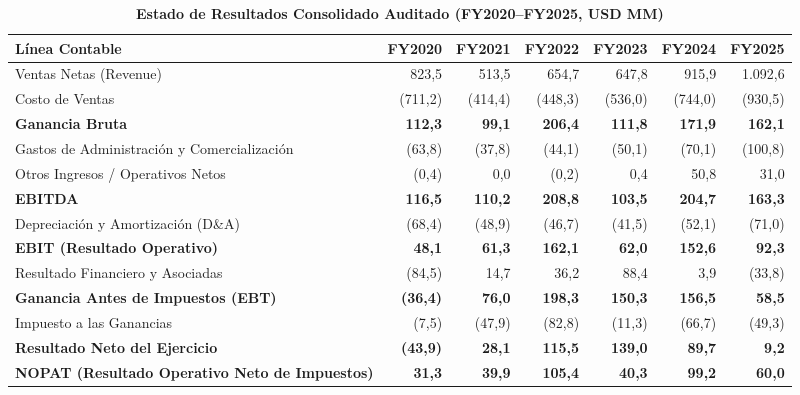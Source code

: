 \documentclass[10pt,a4paper]{article}
\begin{document}
\begin{table}[H]
\centering
\caption{\textbf{Estado de Resultados Consolidado Auditado (FY2020--FY2025, USD MM)}}
\scriptsize
\begin{tabularx}{\textwidth}{Xrrrrrr}
\toprule
\textbf{Línea Contable} & \textbf{FY2020} & \textbf{FY2021} & \textbf{FY2022} & \textbf{FY2023} & \textbf{FY2024} & \textbf{FY2025} \\
\midrule
Ventas Netas (Revenue) & 823,5 & 513,5 & 654,7 & 647,8 & 915,9 & 1.092,6 \\
Costo de Ventas & (711,2) & (414,4) & (448,3) & (536,0) & (744,0) & (930,5) \\
\textbf{Ganancia Bruta} & \textbf{112,3} & \textbf{99,1} & \textbf{206,4} & \textbf{111,8} & \textbf{171,9} & \textbf{162,1} \\
Gastos de Administración y Comercialización & (63,8) & (37,8) & (44,1) & (50,1) & (70,1) & (100,8) \\
Otros Ingresos / Operativos Netos & (0,4) & 0,0 & (0,2) & 0,4 & 50,8 & 31,0 \\
\textbf{EBITDA} & \textbf{116,5} & \textbf{110,2} & \textbf{208,8} & \textbf{103,5} & \textbf{204,7} & \textbf{163,3} \\
Depreciación y Amortización (D\&A) & (68,4) & (48,9) & (46,7) & (41,5) & (52,1) & (71,0) \\
\textbf{EBIT (Resultado Operativo)} & \textbf{48,1} & \textbf{61,3} & \textbf{162,1} & \textbf{62,0} & \textbf{152,6} & \textbf{92,3} \\
Resultado Financiero y Asociadas & (84,5) & 14,7 & 36,2 & 88,4 & 3,9 & (33,8) \\
\textbf{Ganancia Antes de Impuestos (EBT)} & \textbf{(36,4)} & \textbf{76,0} & \textbf{198,3} & \textbf{150,3} & \textbf{156,5} & \textbf{58,5} \\
Impuesto a las Ganancias & (7,5) & (47,9) & (82,8) & (11,3) & (66,7) & (49,3) \\
\textbf{Resultado Neto del Ejercicio} & \textbf{(43,9)} & \textbf{28,1} & \textbf{115,5} & \textbf{139,0} & \textbf{89,7} & \textbf{9,2} \\
\textbf{NOPAT (Resultado Operativo Neto de Impuestos)} & \textbf{31,3} & \textbf{39,9} & \textbf{105,4} & \textbf{40,3} & \textbf{99,2} & \textbf{60,0} \\
\bottomrule
\end{tabularx}
\end{table}
\end{document}
